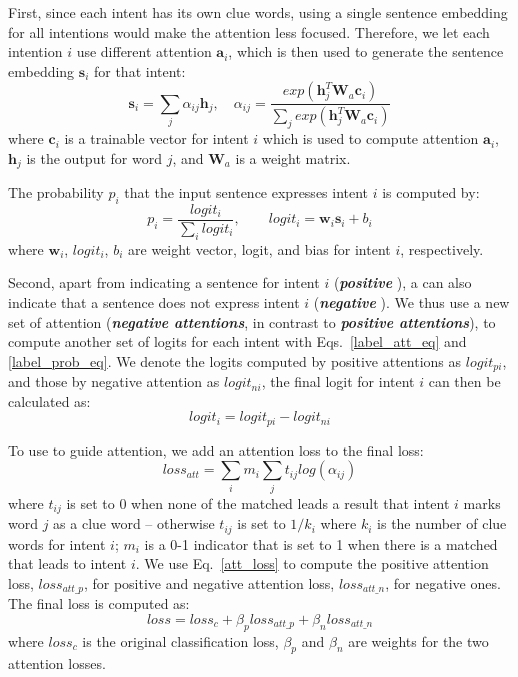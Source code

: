 First, since each intent has its own clue words, using a single sentence embedding for all intentions %
would make the attention less focused.
Therefore, we let each intention $i$ use different attention $\textbf{a}_i$, which is then used to generate the sentence embedding
$\textbf{s}_i$ for that intent:
\begin{equation}
\textbf{s}_i = \sum_{j}{\alpha_{ij}\textbf{h}_j}, \quad
\alpha_{ij}=\frac{exp(\textbf{h}_j^T\textbf{W}_a\textbf{c}_i)}{\sum_{j}{exp(\textbf{h}_j^T\textbf{W}_a\textbf{c}_i)}}
\label{label_att_eq}
\end{equation}
where $\textbf{c}_i$ is a trainable vector for intent $i$ which is used to compute attention $\textbf{a}_i$, $\textbf{h}_j$ is the \BLSTM output for word $j$, and $\textbf{W}_a$ is a weight matrix.

The probability $p_i$ that the input sentence expresses intent $i$ is computed by:
\begin{equation}
p_i = \frac{logit_i}{\sum_{i}{logit_i}}, \quad\quad logit_i=\textbf{w}_i\textbf{s}_i + b_i
\label{label_prob_eq}
\end{equation}
where $\textbf{w}_i$, $logit_i$, $b_i$ are weight vector, logit, and bias for intent $i$, respectively.

Second, apart from indicating a sentence for intent $i$ (\textbf{\emph{positive \REs}}),
a \RE can also indicate that a sentence does not express intent $i$ (\textbf{\emph{negative \REs}}).
We thus use a new set of attention (\textbf{\emph{negative attentions}}, in contrast to \textbf{\emph{positive attentions}}), to compute
another set of logits for each intent with Eqs.~\ref{label_att_eq} and \ref{label_prob_eq}. We denote the logits computed by positive
attentions as $logit_{pi}$, and those by negative attention as $logit_{ni}$, the final logit for intent $i$ can then be calculated as:
\begin{equation}
logit_i = logit_{pi} - logit_{ni}
\end{equation}

To use \REs to guide attention, we add an attention loss to the final loss:
\begin{equation}
loss_{att} = \sum_{i}{m_i\sum_{j}{t_{ij}log(\alpha_{ij})}}
\label{att_loss}
\end{equation}
where $t_{ij}$ is set to $0$ when none of the matched \REs leads a result that intent $i$ marks word $j$ as a clue word -- otherwise
$t_{ij}$ is set to $1/k_{i}$ where $k_i$ is the number of clue words
for intent $i$; $m_i$ is a 0-1 indicator that is set to 1 when there is a matched \RE that leads to intent $i$. We use Eq.~\ref{att_loss}
to compute the positive attention loss, $loss_{att\_p}$, for positive \REs and negative attention loss, $loss_{att\_n}$, for negative ones.
The final loss is computed as:
\begin{equation}
loss = loss_{c} + \beta_p loss_{att\_p} + \beta_n loss_{att\_n}
\end{equation}
where $loss_{c}$ is the original classification loss, $\beta_p$ and $\beta_n$ are weights for the two attention losses.

